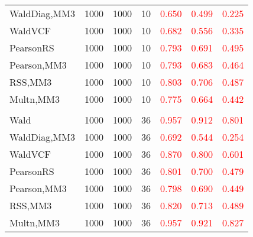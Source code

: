 \documentclass[
]{article}
\begin{document}
\begin{table}[H]
{\begin{tabular}[t]{lrrrrrr}
\hspace{1em}WaldDiag,MM3 & 1000 & 1000 & 10 & \textcolor{red}{0.650} & \textcolor{red}{0.499} & \textcolor{red}{0.225}\\
\hspace{1em}WaldVCF & 1000 & 1000 & 10 & \textcolor{red}{0.682} & \textcolor{red}{0.556} & \textcolor{red}{0.335}\\
\hspace{1em}PearsonRS & 1000 & 1000 & 10 & \textcolor{red}{0.793} & \textcolor{red}{0.691} & \textcolor{red}{0.495}\\
\hspace{1em}Pearson,MM3 & 1000 & 1000 & 10 & \textcolor{red}{0.793} & \textcolor{red}{0.683} & \textcolor{red}{0.464}\\
\hspace{1em}RSS,MM3 & 1000 & 1000 & 10 & \textcolor{red}{0.803} & \textcolor{red}{0.706} & \textcolor{red}{0.487}\\
\hspace{1em}Multn,MM3 & 1000 & 1000 & 10 & \textcolor{red}{0.775} & \textcolor{red}{0.664} & \textcolor{red}{0.442}\\
\addlinespace[0.3em]
\multicolumn{7}{l}{\textbf{3F 15V}}\\
\hspace{1em}Wald & 1000 & 1000 & 36 & \textcolor{red}{0.957} & \textcolor{red}{0.912} & \textcolor{red}{0.801}\\
\hspace{1em}WaldDiag,MM3 & 1000 & 1000 & 36 & \textcolor{red}{0.692} & \textcolor{red}{0.544} & \textcolor{red}{0.254}\\
\hspace{1em}WaldVCF & 1000 & 1000 & 36 & \textcolor{red}{0.870} & \textcolor{red}{0.800} & \textcolor{red}{0.601}\\
\hspace{1em}PearsonRS & 1000 & 1000 & 36 & \textcolor{red}{0.801} & \textcolor{red}{0.700} & \textcolor{red}{0.479}\\
\hspace{1em}Pearson,MM3 & 1000 & 1000 & 36 & \textcolor{red}{0.798} & \textcolor{red}{0.690} & \textcolor{red}{0.449}\\
\hspace{1em}RSS,MM3 & 1000 & 1000 & 36 & \textcolor{red}{0.820} & \textcolor{red}{0.713} & \textcolor{red}{0.489}\\
\hspace{1em}Multn,MM3 & 1000 & 1000 & 36 & \textcolor{red}{0.957} & \textcolor{red}{0.921} & \textcolor{red}{0.827}\\
\bottomrule
\end{tabular}}
\endgroup{}
\end{table}
\end{document}
